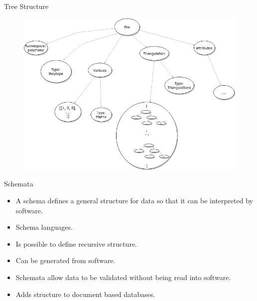 \documentclass[9pt]{beamer}
\theoremstyle{definition}
\begin{document}
\begin{frame}[fragile]{Tree Structure}
  \begin{figure}
    \includegraphics[width=.9\textwidth, height=0.86\textheight]{images/tree-diagram}
  \end{figure}
\end{frame}



\begin{frame}[fragile]{Schemata}
  \begin{itemize}
  \item A schema defines a general structure for data so that it can be interpreted by software. \pause
  \item Schema languages. \pause
  \item Is possible to define recursive structure. \pause
  \item Can be generated from software. \pause
  \item Schemata allow data to be validated without being read into software. \pause
  \item Adds structure to document based databases.
  \end{itemize}
\end{frame}

\end{document}
